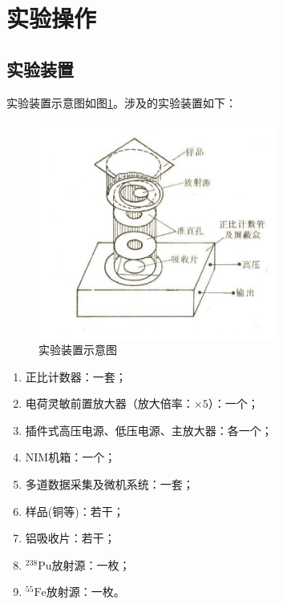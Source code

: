\documentclass{article}
\begin{document}
    \section{实验操作}
    \subsection{实验装置}
    实验装置示意图如图\ref{fig:ExpIns}。涉及的实验装置如下：
    \begin{figure}[htbp]
        \centering
        \includegraphics[width=0.7\textwidth]{../plot/ExpIns.png}
        \caption{实验装置示意图\label{fig:ExpIns}}
    \end{figure}
    \begin{enumerate}
        \item 正比计数器：一套；
        \item 电荷灵敏前置放大器（放大倍率：$\times 5$）：一个；
        \item 插件式高压电源、低压电源、主放大器：各一个；
        \item NIM机箱：一个；
        \item 多道数据采集及微机系统：一套；
        \item 样品(铜等)：若干；
        \item 铝吸收片：若干；
        \item $^{238}\text{Pu}$放射源：一枚；
        \item $^{55}\text{Fe}$放射源：一枚。
    \end{enumerate}
\end{document}
